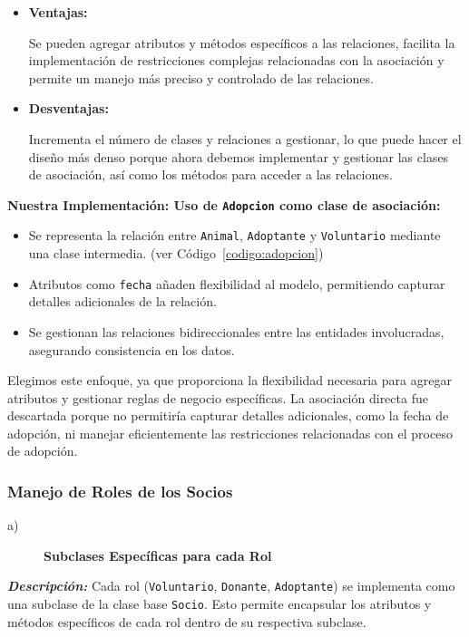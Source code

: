 \begin{itemize}
    \item \textbf{Ventajas:}\par
    Se pueden agregar atributos y métodos específicos a las relaciones,
    facilita la implementación de restricciones complejas relacionadas con la asociación y
    permite un manejo más preciso y controlado de las relaciones.
    \item \textbf{Desventajas:}\par
    Incrementa el número de clases y relaciones a gestionar, lo que puede hacer el diseño más denso
    porque ahora debemos implementar y gestionar las clases de asociación, así como los métodos para 
    acceder a las relaciones.
\end{itemize}

\textbf{Nuestra Implementación: Uso de \texttt{Adopcion} como clase de asociación:}
\begin{itemize}
    \item Se representa la relación entre \texttt{Animal}, \texttt{Adoptante} y 
    \texttt{Voluntario} mediante una clase intermedia. (ver Código~\ref{codigo:adopcion})
    \item Atributos como \texttt{fecha} añaden flexibilidad al modelo, permitiendo 
    capturar detalles adicionales de la relación.
    \item Se gestionan las relaciones bidireccionales entre las entidades involucradas, 
    asegurando consistencia en los datos.
\end{itemize}

Elegimos este enfoque, ya que proporciona la flexibilidad necesaria para agregar atributos 
y gestionar reglas de negocio específicas. La asociación directa fue descartada porque no 
permitiría capturar detalles adicionales, como la fecha de adopción, ni manejar eficientemente 
las restricciones relacionadas con el proceso de adopción.



\subsubsection{Manejo de Roles de los Socios}

\begin{description}
    \item[a)] \textbf{Subclases Específicas para cada Rol}
\end{description}

\textit{\textbf{Descripción:}}  
Cada rol (\texttt{Voluntario}, \texttt{Donante}, \texttt{Adoptante}) se implementa como una 
subclase de la clase base \texttt{Socio}. Esto permite encapsular los atributos y métodos 
específicos de cada rol dentro de su respectiva subclase.

